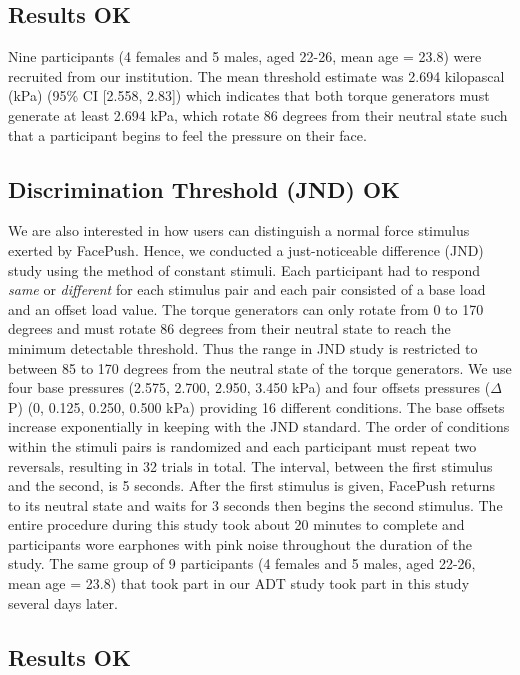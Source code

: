 \subsection{Results OK}
Nine participants (4 females and 5 males, aged 22-26, mean age = 23.8) were recruited from our institution. The mean threshold estimate was 2.694 kilopascal (kPa) (95\% CI [2.558, 2.83]) which indicates that both torque generators must generate at least 2.694 kPa, which rotate 86 degrees from their neutral state such that a participant begins to feel the pressure on their face.

\subsection{Discrimination Threshold (JND) OK}
We are also interested in how users can distinguish a normal force stimulus exerted by FacePush. Hence, we conducted a just-noticeable difference (JND) study using the method of constant stimuli. Each participant had to respond \textit{same} or \textit{different} for each stimulus pair and each pair consisted of a base load and an offset load value. The torque generators can only rotate from 0 to 170 degrees and must rotate 86 degrees from their neutral state to reach the minimum detectable threshold. Thus the range in JND study is restricted to between 85 to 170 degrees from the neutral state of the torque generators. We use four base pressures (2.575, 2.700, 2.950, 3.450 kPa) and four offsets pressures ($\Delta$P) (0, 0.125, 0.250, 0.500 kPa) providing 16 different conditions. The base offsets increase exponentially in keeping with the JND standard. The order of conditions within the stimuli pairs is randomized and each participant must repeat two reversals, resulting in 32 trials in total. The interval, between the first stimulus and the second, is 5 seconds. After the first stimulus is given, FacePush returns to its neutral state and waits for 3 seconds then begins the second stimulus. The entire procedure during this study took about 20 minutes to complete and participants wore earphones with pink noise throughout the duration of the study. The same group of 9 participants (4 females and 5 males, aged 22-26, mean age = 23.8) that took part in our ADT study took part in this study several days later.

\subsection{Results OK}

